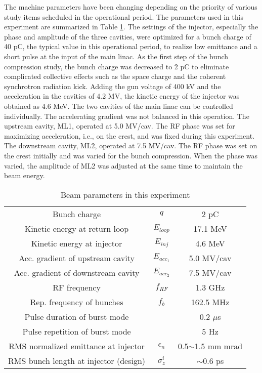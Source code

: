 \documentclass[review]{elsarticle}
\begin{document}
The machine parameters have been changing
depending on the priority of various study items scheduled in the operational period.
The parameters used in this experiment are summarized in Table \ref{tab:accparam}.
The settings of the injector, especially the phase and amplitude of the three cavities,
were optimized for a bunch charge of 40 pC, 
the typical value in this operational period, 
to realize low emittance and a short pulse
at the input of the main linac.
As the first step of the bunch compression study,
the bunch charge was decreased to 2 pC 
to eliminate complicated collective effects
such as the space charge and the coherent synchrotron radiation kick.
Adding the gun voltage of 400 kV 
and the acceleration in the cavities of 4.2 MV,
the kinetic energy of the injector was obtained as 4.6 MeV.
The two cavities of the main linac can be controlled individually.
The accelerating gradient was not balanced in this operation.
The upstream cavity, ML1,
operated at 5.0 MV/cav.
The RF phase was set for maximizing acceleration, i.e., on the crest,
and  was fixed during this experiment.
The downstream cavity, ML2,
operated at 7.5 MV/cav.
The RF phase was set on the crest initially
and was varied for the bunch compression.
When the phase was varied,
the amplitude of ML2 was adjusted at the same time
to maintain the beam energy.
 

\begin{table}[htb]
  \begin{center}
    \caption{Beam parameters in this experiment}
    \label{tab:accparam}
    \begin{tabular}{c   c | c } \hline
      Bunch charge & $q$ & 2 pC\\ 
      Kinetic energy at return loop & $E_{loop}$ & 17.1 MeV  \\ 
      Kinetic energy at injector  & $E_{inj}$ & 4.6 MeV \\
      Acc. gradient of upstream cavity & $E_{acc_1}$ & 5.0 MV/cav \\
      Acc. gradient of downstream cavity & $E_{acc_2}$ & 7.5 MV/cav \\
      RF frequency & $f_{RF}$& 1.3 GHz\\
      Rep. frequency of bunches & $f_{b}$& 162.5 MHz\\
      Pulse duration of burst mode & & 0.2 $\mu$s\\
      Pulse repetition of burst mode & & 5 Hz\\
     RMS normalized emittance at injector & $\epsilon_{n}$ & 0.5$\sim$1.5 mm mrad \\
     RMS bunch length at injector (design) & $\sigma_z^i$& $ \sim$0.6 ps \\
      \hline
    \end{tabular}
  \end{center}
\end{table}
\end{document}
